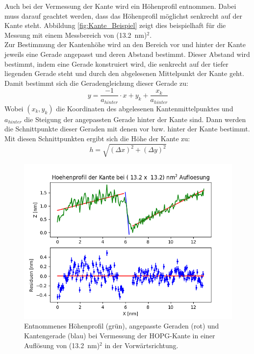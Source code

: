 \documentclass[12pt,a4paper]{article}
\begin{document}
Auch bei der Vermessung der Kante wird ein Höhenprofil entnommen. Dabei muss darauf geachtet werden, dass das Höhenprofil möglichst senkrecht auf der Kante steht. Abbildung \ref{fig:Kante_Beispiel} zeigt dies beispielhaft für die Messung mit einem Messbereich von (\SI{13,2}{nm})$^2$.\\
Zur Bestimmung der Kantenhöhe wird an den Bereich vor und hinter der Kante jeweils eine Gerade angepasst und deren Abstand bestimmt. Dieser Abstand wird bestimmt, indem eine Gerade konstruiert wird, die senkrecht auf der tiefer liegenden Gerade steht und durch den abgelesenen Mittelpunkt der Kante geht. Damit bestimmt sich die Geradengleichung dieser Gerade zu:
\begin{equation*}
y = \dfrac{-1}{a_{hinter}} \cdot x + y_k + \dfrac{x_k}{a_{hinter}}
\end{equation*}
Wobei $(x_k, y_k)$ die Koordinaten des abgelesenen Kantenmittelpunktes und $a_{hinter}$ die Steigung der angepassten Gerade hinter der Kante sind. Dann werden die Schnittpunkte dieser Geraden mit denen vor bzw. hinter der Kante bestimmt. Mit diesen Schnittpunkten ergibt sich die Höhe der Kante zu:
\begin{equation*}
h = \sqrt{(\Delta x)^2 + (\Delta y)^2}
\end{equation*}

\begin{figure}
\centering
\includegraphics[scale=0.6]{Bilder/Anhang/Kante/Profil_Kante_0132_vor.png}
\caption{Entnommenes Höhenprofil (grün), angepasste Geraden (rot) und Kantengerade (blau) bei Vermessung der HOPG-Kante in einer Auflösung von (\SI{13,2}{nm})$^2$ in der Vorwärtsrichtung.}
\label{fig:Kante_Hoehenprofil_Beispiel}
\end{figure}
\end{document}

